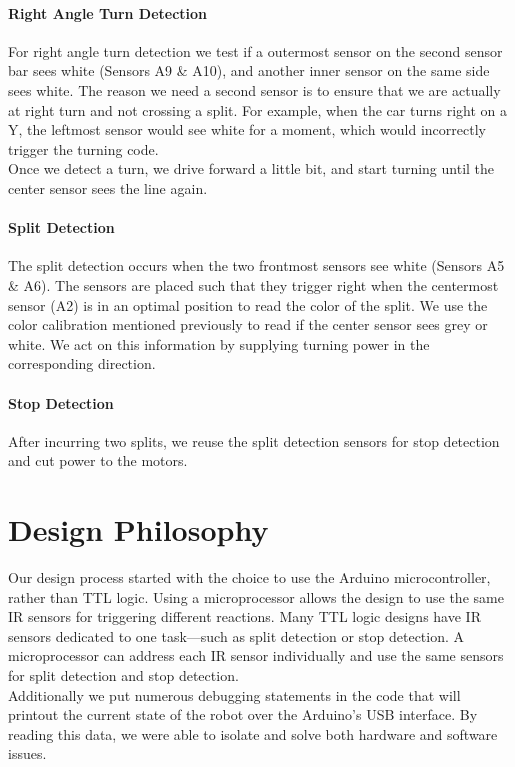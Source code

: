 \documentclass{article}
\begin{document}
\subsection{Right Angle Turn Detection}
For right angle turn detection we test if a outermost sensor on the second sensor bar sees white (Sensors A9 \& A10), and another inner sensor on the same side sees white. The reason we need a second sensor is to ensure that we are actually at right turn and not crossing a split. For example, when the car turns right on a Y, the leftmost sensor would see white for a moment, which would incorrectly trigger the turning code.\\
Once we detect a turn, we drive forward a little bit, and start turning until the center sensor sees the line again.
\subsection{Split Detection}
The split detection occurs when the two frontmost sensors see white (Sensors A5 \& A6). The sensors are placed such that they trigger right when the centermost sensor (A2) is in an optimal position to read the color of the split. We use the color calibration mentioned previously to read if the center sensor sees grey or white. We act on this information by supplying turning power in the corresponding direction.
\subsection{Stop Detection}
After incurring two splits, we reuse the split detection sensors for stop detection and cut power to the motors.

\part{Design Philosophy}
Our design process started with the choice to use the Arduino microcontroller, rather than TTL logic. Using a microprocessor allows the design to use the same IR sensors for triggering different reactions. Many TTL logic designs have IR sensors dedicated to one task---such as split detection or stop detection. A microprocessor can address each IR sensor individually and use the same sensors for split detection and stop detection.\\
Additionally we put numerous debugging statements in the code that will printout the current state of the robot over the Arduino's USB interface. By reading this data, we were able to isolate and solve both hardware and software issues.
\end{document}
